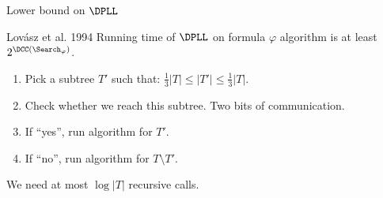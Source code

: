 \begin{frame}{Lower bound on $\DPLL$}

    \begin{block}{Lov{\'{a}}sz et al. 1994}
        Running time of $\DPLL$ on formula $\varphi$ algorithm is at least $2^{\DCC(\Search_{\varphi})}$.
    \end{block}

    \begin{minipage}{0.54\linewidth}
        \begin{enumerate}
            \item<2-> Pick a subtree $T'$ such that: $\frac{1}{3}|T| \le |T'| \le \frac{1}{3}|T|$.
            \item<4-> Check whether we reach this subtree. Two bits of communication.
            \item<6-> If ``yes'', run algorithm for $T'$.
            \item<7-> If ``no'', run algorithm for $T \setminus T'$.
        \end{enumerate}
    \end{minipage}
    \begin{minipage}{0.45\linewidth}
        \begin{center}
            
        \end{center}
    \end{minipage}

    \vspace{0.1cm}
        
	\pause
    \pause
    \pause
    \pause
    \pause
    \pause
    \pause
    
    \vspace{0.1cm}

    We need at most $\log |T|$ recursive calls.

\end{frame}